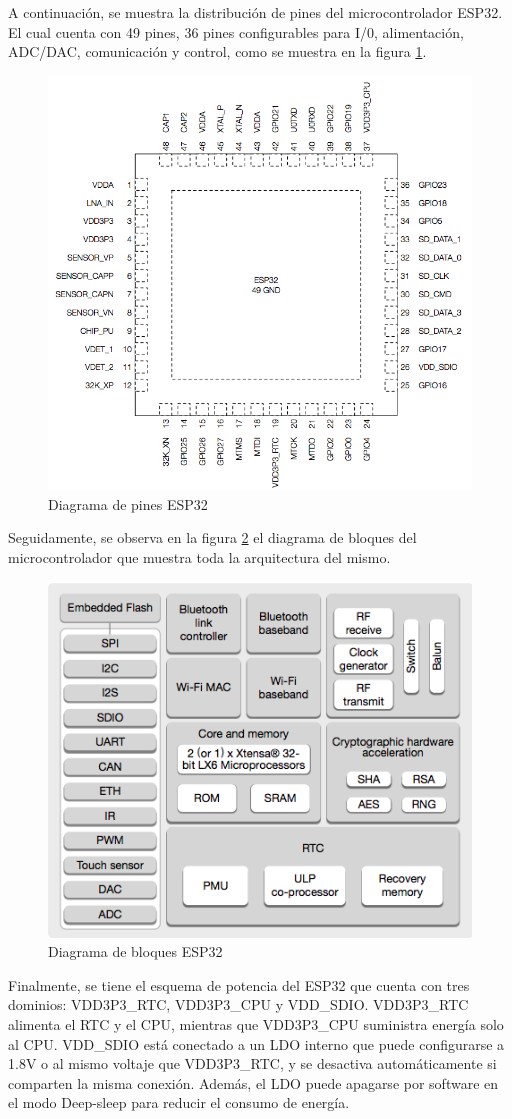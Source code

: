 \documentclass[12pt,a4paper]{article}
\begin{document}
A continuación, se muestra la distribución de pines del microcontrolador ESP32. El cual cuenta con 49 pines, 36 pines configurables para I/0, alimentación, ADC/DAC, comunicación y control, como se muestra en la figura \ref{fig:1}.

\begin{figure}[H]
    \centering
    \includegraphics[width=0.5\linewidth]{Imagenes/pines.png}
    \caption{Diagrama de pines ESP32 \cite{esp32}}
    \label{fig:1}
\end{figure}

Seguidamente, se observa en la figura \ref{fig:2} el diagrama de bloques del microcontrolador que muestra toda la arquitectura del mismo.
\begin{figure}[H]
    \centering
    \includegraphics[width=0.5\linewidth]{Imagenes/bd.png}
    \caption{Diagrama de bloques ESP32 \cite{esp32}}
    \label{fig:2}
\end{figure}

Finalmente, se tiene el esquema de potencia del ESP32 que cuenta con tres dominios: VDD3P3\_RTC, VDD3P3\_CPU y VDD\_SDIO. VDD3P3\_RTC alimenta el RTC y el CPU, mientras que VDD3P3\_CPU suministra energía solo al CPU. VDD\_SDIO está conectado a un LDO interno que puede configurarse a 1.8V o al mismo voltaje que VDD3P3\_RTC, y se desactiva automáticamente si comparten la misma conexión. Además, el LDO puede apagarse por software en el modo Deep-sleep para reducir el consumo de energía.
\end{document}
